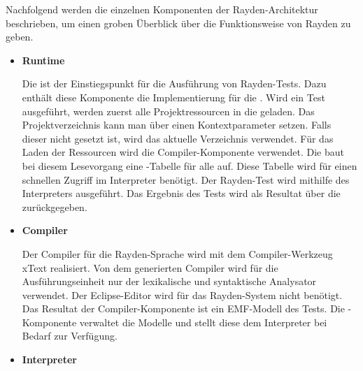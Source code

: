 \SuperPar
Nachfolgend werden die einzelnen Komponenten der Rayden-Architektur beschrieben, um einen groben Überblick über die Funktionsweise von Rayden zu geben.\\

\begin{itemize}

\item \textbf{Runtime}

Die  ist der Einstiegspunkt für die Ausführung von Rayden-Tests. Dazu enthält diese Komponente die Implementierung für die . Wird ein Test ausgeführt, werden zuerst alle Projektressourcen in die  geladen. Das Projektverzeichnis kann man über einen Kontextparameter setzen. Falls dieser nicht gesetzt ist, wird das aktuelle Verzeichnis verwendet. Für das Laden der Ressourcen wird die Compiler-Komponente verwendet. Die  baut bei diesem Lesevorgang eine -Tabelle für alle  auf. Diese Tabelle wird für einen schnellen Zugriff im Interpreter benötigt. Der Rayden-Test wird mithilfe des Interpreters ausgeführt. Das Ergebnis des Tests wird als Resultat über die  zurückgegeben.\\

\item \textbf{Compiler}

Der Compiler für die Rayden-Sprache wird mit dem Compiler-Werkzeug xText \cite{xtext} realisiert. Von dem generierten Compiler wird für die Ausführungseinheit nur der lexikalische und syntaktische Analysator verwendet. Der Eclipse-Editor wird für das Rayden-System nicht benötigt. Das Resultat der Compiler-Komponente ist ein EMF-Modell des Tests. Die -Komponente verwaltet die Modelle und stellt diese dem Interpreter bei Bedarf zur Verfügung.\\

\item \textbf{Interpreter}


\end{itemize}
